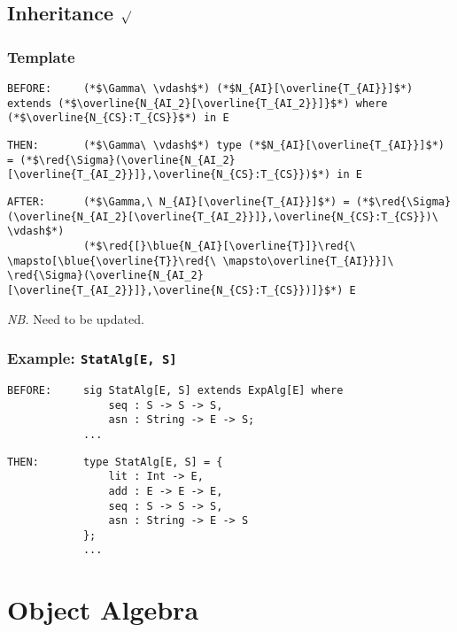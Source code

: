 \documentclass{article}
\newcommand{\red}[1]{\textcolor{red}{#1}}
\newcommand{\blue}[1]{\textcolor{blue}{#1}}
\newcommand{\nb}{\textit{NB. }}
\begin{document}
\begin{spacing}{1.1}
\subsection{Inheritance $\surd$}

\subsubsection{Template}

\begin{lstlisting}[numbers=none]
BEFORE:     (*$\Gamma\ \vdash$*) (*$N_{AI}[\overline{T_{AI}}]$*) extends (*$\overline{N_{AI_2}[\overline{T_{AI_2}}]}$*) where (*$\overline{N_{CS}:T_{CS}}$*) in E
\end{lstlisting}
\begin{lstlisting}[numbers=none]
THEN:       (*$\Gamma\ \vdash$*) type (*$N_{AI}[\overline{T_{AI}}]$*) = (*$\red{\Sigma}(\overline{N_{AI_2}[\overline{T_{AI_2}}]},\overline{N_{CS}:T_{CS}})$*) in E
\end{lstlisting}
\begin{lstlisting}[numbers=none]
AFTER:      (*$\Gamma,\ N_{AI}[\overline{T_{AI}}]$*) = (*$\red{\Sigma}(\overline{N_{AI_2}[\overline{T_{AI_2}}]},\overline{N_{CS}:T_{CS}})\ \vdash$*)
            (*$\red{[}\blue{N_{AI}[\overline{T}]}\red{\ \mapsto[\blue{\overline{T}}\red{\ \mapsto\overline{T_{AI}}}]\ \red{\Sigma}(\overline{N_{AI_2}[\overline{T_{AI_2}}]},\overline{N_{CS}:T_{CS}})]}$*) E
\end{lstlisting}

\nb Need to be updated.

\subsubsection{Example: \lstinline{StatAlg[E, S]}}

\begin{lstlisting}[numbers=none]
BEFORE:     sig StatAlg[E, S] extends ExpAlg[E] where
                seq : S -> S -> S,
                asn : String -> E -> S;
            ...
\end{lstlisting}
\begin{lstlisting}[numbers=none]
THEN:       type StatAlg[E, S] = {
                lit : Int -> E,
                add : E -> E -> E,
                seq : S -> S -> S,
                asn : String -> E -> S
            };
            ...
\end{lstlisting}

\section{Object Algebra}


\end{spacing}
\end{document}
